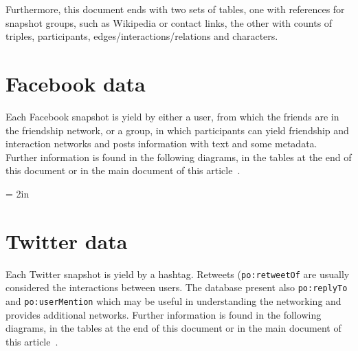 \documentclass[review]{elsarticle}
\newcommand{\te}[1] {\texttt{\footnotesize#1}}
\begin{document}
Furthermore, this document ends with two sets of tables, one with
references for snapshot groups, such as Wikipedia or
contact links, 
the other with 
counts of
triples, participants, edges/interactions/relations and characters.


\section{Facebook data}
Each Facebook snapshot is yield by either a user, from which the
friends are in the friendship network, or a group, in which participants
can yield friendship and interaction networks and posts information with
text and some metadata.
Further information is found in the following diagrams, in the tables at
the end of this document or in the main document of this article~\cite{losd}.

% 

\textheight = 2in
\pdfpageheight 5in

\section{Twitter data}
Each Twitter snapshot is yield by a hashtag.
Retweets (\te{po:retweetOf} are usually considered the interactions between users.
The database present also \te{po:replyTo} and \te{po:userMention}
which may be useful in understanding the networking and provides additional networks.
Further information is found in the following diagrams, in the tables at
the end of this document or in the main document of this article~\cite{losd}.


\end{document}
